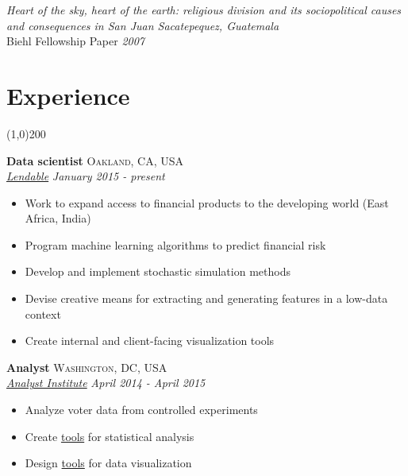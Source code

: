 \documentclass[11pt]{article}
\begin{document}
\noindent \emph{Heart of the sky, heart of the earth: religious division and its sociopolitical causes and consequences in San Juan Sacatepequez, Guatemala} \\ Biehl Fellowship Paper \hfill \emph{2007}\\



\section*{Experience} %
\vspace{-7mm}
\line(1,0){200}
\vspace{2mm}

\noindent \textbf{Data scientist} \hfill \textsc{Oakland, CA, USA}\\
\noindent \emph{\href{http://lendable.io}{Lendable}} \hfill \emph{January 2015 - present}
\vspace{-2mm}
\begin{itemize}\itemsep0pt \parskip0pt 
\item Work to expand access to financial products to the developing world (East Africa, India)
\item Program machine learning algorithms to predict financial risk
\item Develop and implement stochastic simulation methods 
\item Devise creative means for extracting and generating features in a low-data context 
\item Create internal and client-facing visualization tools
\end{itemize}

\noindent \textbf{Analyst} \hfill \textsc{Washington, DC, USA}\\
\noindent \emph{\href{https://analystinstitute.org/}{Analyst Institute}} \hfill \emph{April 2014 - April 2015}
\vspace{-2mm}
\begin{itemize}\itemsep0pt \parskip0pt 
\item Analyze voter data from controlled experiments
\item Create \href{https://analystinstitute.org/power-calculator/}{tools} for statistical analysis 
\item Design \href{http://spark.rstudio.com/joebrew/ate/}{tools} for data visualization
\end{itemize}
\end{document}
